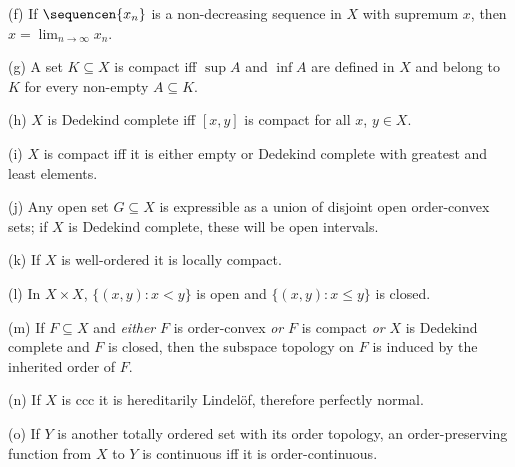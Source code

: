 (f) If $\sequencen{x_n}$ is a non-decreasing sequence in $X$
with supremum $x$, then $x=\lim_{n\to\infty}x_n$.

(g) A set $K\subseteq X$ is compact iff $\sup A$ and
$\inf A$ are defined in
$X$ and belong to $K$ for every non-empty $A\subseteq K$.

(h) $X$ is Dedekind complete iff $[x,y]$ is compact for
all $x$, $y\in X$.

(i) $X$ is compact iff it is either empty or Dedekind complete
with greatest and least elements.

(j) Any open set $G\subseteq X$ is
expressible as a union of disjoint open order-convex sets;  if
$X$ is Dedekind complete, these will be open intervals.

(k) If $X$ is well-ordered it is locally compact.

(l) In $X\times X$, $\{(x,y):x<y\}$ is open and $\{(x,y):x\le y\}$ is
closed.

(m) If $F\subseteq X$ and {\it either} $F$ is order-convex {\it or} $F$
is compact {\it or} $X$ is Dedekind complete and $F$ is closed, then
the subspace topology on $F$ is induced by the inherited order of $F$.

(n) If $X$ is ccc it is hereditarily Lindel\"of, therefore perfectly
normal.

(o) If $Y$ is another totally ordered set with its order topology, an
order-preserving function from $X$ to $Y$ is continuous iff it is
order-continuous.

